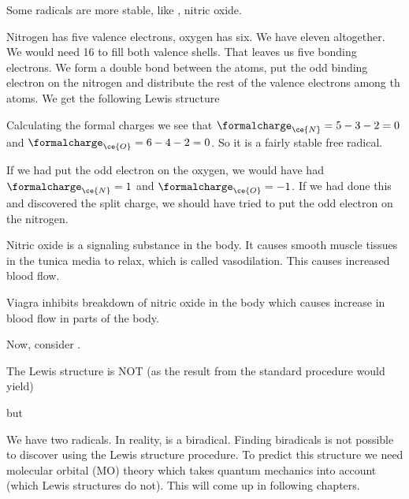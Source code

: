 \documentclass[../mit-general-chemistry.tex]{subfiles}
\begin{document}
Some radicals are more stable, like , nitric oxide.

Nitrogen has five valence electrons, oxygen has six. We have eleven
altogether. We would need 16 to fill both valence shells. That leaves
us five bonding electrons. We form a double bond between the atoms,
put the odd binding electron on the nitrogen and distribute the rest
of the valence electrons among th atoms. We get the following Lewis
structure

\begin{center}
\end{center}

Calculating the formal charges  we see that $\formalcharge_{\ce{N}} =
5 - 3 - 2 = 0$ and $\formalcharge_{\ce{O}} = 6 - 4 - 2 = 0$. So it is
a fairly stable free radical.

If we had put the odd electron on the oxygen, we would have had
$\formalcharge_{\ce{N}}  = 1$ and $\formalcharge_{\ce{O}} = -1$. If we
had done this and discovered the split charge, we should have tried to
put the odd electron on the nitrogen.

Nitric oxide is a signaling substance in the body. It causes smooth
muscle tissues in the tunica media to relax, which is called
vasodilation. This causes increased blood flow.

Viagra inhibits breakdown of nitric oxide in the body which causes
increase in blood flow in parts of the body.



Now, consider .

The Lewis structure is NOT (as the result from the standard procedure
would yield)

\begin{center}
\end{center}

but  

\begin{center}
\end{center}

We have two radicals. In reality,  is a biradical. Finding
biradicals is not possible to discover using the Lewis structure
procedure. To predict this structure we need molecular orbital (MO)
theory which takes quantum mechanics into account (which Lewis
structures do not). This will come up in following chapters.
\end{document}
